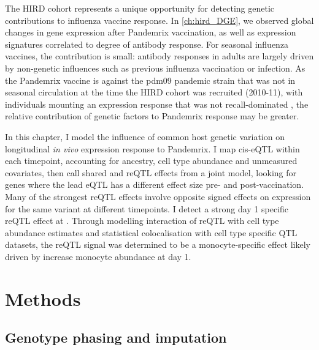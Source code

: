The HIRD cohort represents a unique opportunity for detecting genetic contributions to influenza vaccine response.
In \autoref{ch:hird_DGE}, we observed global changes in gene expression after Pandemrix vaccination, as well as expression signatures correlated to degree of antibody response.
For seasonal influenza vaccines, the contribution is small: antibody responses in adults are largely driven by non-genetic influences such as previous influenza vaccination or infection\autocite{brodin2015VariationHumanImmune}.
As the Pandemrix vaccine is against the pdm09 pandemic strain that was not in seasonal circulation at the time the \gls{HIRD} cohort was recruited (2010-11), 
with individuals mounting an expression response that was not recall-dominated \autocite{sobolev2016AdjuvantedInfluenzaH1N1Vaccination},
the relative contribution of genetic factors to Pandemrix response may be greater.

In this chapter, I model the influence of common host genetic variation on longitudinal \textit{in vivo} expression response to Pandemrix.
I map cis-eQTL within each timepoint, accounting for ancestry, cell type abundance and unmeasured covariates, 
then call shared and reQTL effects from a joint model, 
looking for genes where the lead eQTL has a different effect size pre- and post-vaccination.
Many of the strongest reQTL effects involve opposite signed effects on expression for the same variant at different timepoints.
I detect a strong day 1 specific reQTL effect at .
Through modelling interaction of reQTL with cell type abundance estimates and statistical colocalisation with cell type specific QTL datasets, 
the reQTL signal was determined to be a monocyte-specific effect likely driven by increase monocyte abundance at day 1.

\section{Methods}

\subsection{Genotype phasing and imputation}
\label{subsec:hird_reQTL_methods_genotypePhasingAndImputation}

